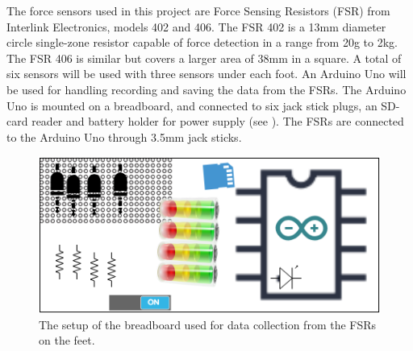 The force sensors used in this project are Force Sensing Resistors (FSR) from Interlink Electronics, models 402 and 406. The FSR 402 is a 13mm diameter circle single-zone resistor capable of force detection in a range from 20g to 2kg. The FSR 406 is similar but covers a larger area of 38mm in a square. \cite{IE400} A total of six sensors will be used with three sensors under each foot. 
An Arduino Uno will be used for handling recording and saving the data from the FSRs. The Arduino Uno is mounted on a breadboard, and connected to six jack stick plugs, an SD-card reader and battery holder for power supply (see ). The FSRs are connected to the Arduino Uno through 3.5mm jack sticks. 

\begin{figure}[H]
	\includegraphics[width=.6\textwidth]{figures/breadboardSetup}
	\caption{The setup of the breadboard used for data collection from the FSRs on the feet.}
	\label{fig:breadboardSetup}  %
\end{figure}





